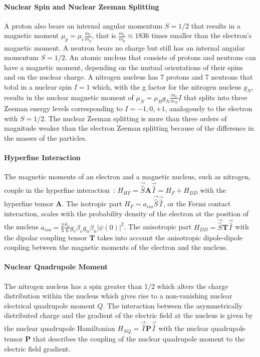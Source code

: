 \paragraph*{Nuclear Spin and Nuclear Zeeman Splitting}
A proton also bears an internal angular momentum $S=1/2$ that results in a magnetic moment $\mu_p = \mu_e\frac{m_e}{m_p}$, that is $\frac{m_e}{m_p}\approx1836$ times smaller than the electron's magnetic moment. A neutron bears no charge but still has an internal angular momentum $S=1/2$. An atomic nucleus that consists of protons and neutrons can have a magnetic moment, depending on the mutual orientations of their spins and on the nuclear charge. A nitrogen nucleus has 7 protons and 7 neutrons that total in a nuclear spin $I=1$ which, with the g factor for the nitrogen nucleus $g_N$, results in the nuclear magnetic moment of $\mu_N=\mu_Bg_N\frac{m_e}{m_N}I$ that splits into three Zeeman energy levels corresponding to $I=-1,0,+1$, analogously to the electron with $S=1/2$. The nuclear Zeeman splitting is more than three orders of magnitude weaker than the electron Zeeman splitting because of the difference in the masses of the particles.

\paragraph*{Hyperfine Interaction}
The magnetic moments of an electron and a magnetic nucleus, such as nitrogen, couple in the hyperfine interaction~\cite{Schweiger2001_hfi}: $H_{HF}=\vec{\hat{S}}\textbf{A}\vec{\hat{I}}=H_F+H_{DD}$ with the hyperfine tensor $\textbf{A}$. The isotropic part $H_F=a_{iso}\vec{\hat{S}}\vec{\hat{I}}$, or the Fermi contact interaction, scales with the probability density of the electron at the position of the nucleus $a_{iso}=\frac{2}{3}\frac{\mu_0}{\hbar}g_e\beta_eg_n\beta_n\vert\psi(0)\vert^2$. The anisotropic part $H_{DD}=\vec{\hat{S}}\textbf{T}\vec{\hat{I}}$ with the dipolar coupling tensor $\textbf{T}$ takes into account the anisotropic dipole-dipole coupling between the magnetic moments of the electron and the nucleus.

\paragraph*{Nuclear Quadrupole Moment}
The nitrogen nucleus has a spin greater than 1/2 which alters the charge distribution within the nucleus which gives rise to a non-vanishing nuclear electrical quadrupole moment $Q$. The interaction between the asymmetrically distributed charge and the gradient of the electric field at the nucleus is given by the nuclear quadrupole Hamiltonian $H_{NQ}=\vec{\hat{I}}\textbf{P}\vec{\hat{I}}$ with the nuclear quadrupole tensor $\textbf{P}$ that describes the coupling of the nuclear quadrupole moment to the electric field gradient.

